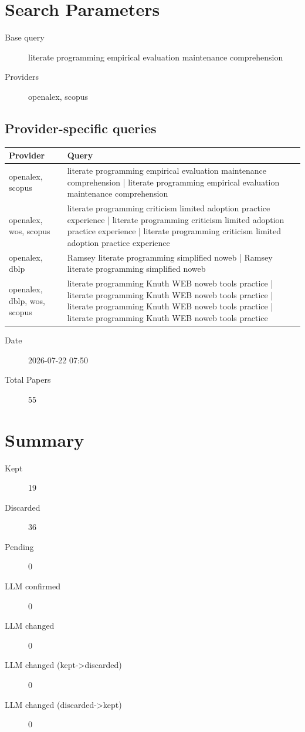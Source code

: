 \documentclass{article}
\begin{document}
\section{Search Parameters}

\begin{description}
\item[Base query] literate programming empirical evaluation maintenance comprehension
\item[Providers] openalex, scopus
\end{description}

\subsection{Provider-specific queries}
\begin{longtable}{lp{10cm}}
\toprule
Provider & Query \\
\midrule
openalex, scopus & literate programming empirical evaluation maintenance comprehension | literate programming empirical evaluation maintenance comprehension \\
openalex, wos, scopus & literate programming criticism limited adoption practice experience | literate programming criticism limited adoption practice experience | literate programming criticism limited adoption practice experience \\
openalex, dblp & Ramsey literate programming simplified noweb | Ramsey literate programming simplified noweb \\
openalex, dblp, wos, scopus & literate programming Knuth WEB noweb tools practice | literate programming Knuth WEB noweb tools practice | literate programming Knuth WEB noweb tools practice | literate programming Knuth WEB noweb tools practice \\
\bottomrule
\end{longtable}

\begin{description}
\item[Date] 2026-07-22 07:50
\item[Total Papers] 55
\end{description}

\section{Summary}
\begin{description}
\item[Kept] 19
\item[Discarded] 36
\item[Pending] 0
\item[LLM confirmed] 0
\item[LLM changed] 0
\item[LLM changed (kept->discarded)] 0
\item[LLM changed (discarded->kept)] 0
\end{description}
\end{document}
